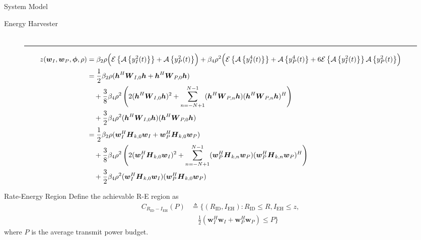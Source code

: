 \documentclass{IEEEtran}
\begin{document}
\begin{section}{System Model}
\begin{subsection}{Energy Harvester}
\begin{figure}[b]
\begin{align}
			\end{align}
		\end{figure}
		\begin{figure}[b]
			\hrule
			\begin{align}
				z(\boldsymbol{w}_I,\boldsymbol{w}_P,\boldsymbol{\phi},\rho)
				& = \beta_2\rho\Bigl(\mathcal{E}\left\{\mathcal{A}\left\{y_{I}^2(t)\right\}\right\}+\mathcal{A}\left\{y_{P}^2(t)\right\}\Bigr)+\beta_4\rho^2\Bigl(\mathcal{E}\left\{\mathcal{A}\left\{y_{I}^4(t)\right\}\right\}+\mathcal{A}\left\{y_{P}^4(t)\right\}+6\mathcal{E}\left\{\mathcal{A}\left\{y_{I}^2(t)\right\}\right\}\mathcal{A}\left\{y_{P}^2(t)\right\}\Bigr)\\
				& = \frac{1}{2}\beta_2\rho(\boldsymbol{h}^H\boldsymbol{W}_{I,0}\boldsymbol{h}+\boldsymbol{h}^H\boldsymbol{W}_{P,0}\boldsymbol{h})\nonumber\\
				& \quad+ \frac{3}{8}\beta_4\rho^2 \left(2(\boldsymbol{h}^H\boldsymbol{W}_{I,0}\boldsymbol{h})^2 + \sum_{n=-N+1}^{N-1} (\boldsymbol{h}^H\boldsymbol{W}_{P,n}\boldsymbol{h})(\boldsymbol{h}^H\boldsymbol{W}_{P,n}\boldsymbol{h})^H\right)\nonumber\\
				& \quad+ \frac{3}{2}\beta_4\rho^2(\boldsymbol{h}^H\boldsymbol{W}_{I,0}\boldsymbol{h})(\boldsymbol{h}^H\boldsymbol{W}_{P,0}\boldsymbol{h})\label{eq:z_expand_1}\\
				& = \frac{1}{2}\beta_2\rho(\boldsymbol{w}_I^H\boldsymbol{H}_{k,0}\boldsymbol{w}_I+\boldsymbol{w}_P^H\boldsymbol{H}_{k,0}\boldsymbol{w}_P)\nonumber\\
				& \quad+ \frac{3}{8}\beta_4\rho^2 \left(2(\boldsymbol{w}_I^H\boldsymbol{H}_{k,0}\boldsymbol{w}_I)^2 + \sum_{n=-N+1}^{N-1}(\boldsymbol{w}_P^H\boldsymbol{H}_{k,n}\boldsymbol{w}_P)(\boldsymbol{w}_P^H\boldsymbol{H}_{k,n}\boldsymbol{w}_P)^H \right)\nonumber\\
				& \quad+ \frac{3}{2}\beta_4\rho^2(\boldsymbol{w}_I^H\boldsymbol{H}_{k,0}\boldsymbol{w}_I)(\boldsymbol{w}_P^H\boldsymbol{H}_{k,0}\boldsymbol{w}_P)\label{eq:z_expand_2}
			\end{align}
		\end{figure}
	\end{subsection}

	\begin{subsection}{Rate-Energy Region}
		Define the achievable R-E region as
		\begin{equation}
			\begin{split}
				C_{R_{\text{ID}}-I_{\text{EH}}}(P)
				&\triangleq \biggl\{(R_{\text{ID}}, I_{\text{EH}}): R_{\text{ID}} \le R, I_{\text{EH}} \le z,\\
				&\quad \frac{1}{2}({\boldsymbol{w}_I^H}{\boldsymbol{w}_I}+{\boldsymbol{w}_P^H}{\boldsymbol{w}_P}) \le P\biggr\}
			\end{split}
		\end{equation}
		where $P$ is the average transmit power budget.
	\end{subsection}
\end{section}
\end{document}
